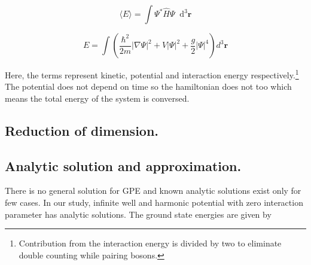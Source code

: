 \documentclass[a4paper,times,hidelinks,12pt]{article}
\newcommand*\dif{\mathop{}\!\mathrm{d}}
\begin{document}
\begin{equation}
\label{GPE_total_energy_general}
\langle E \rangle = \int \Psi^{*}\hat{H}\Psi \dif^3\boldsymbol{r}
\end{equation}

\begin{equation}
\label{GPE_total_energy}
E = \int \left(\frac {\hbar^2}{2m}|\nabla
\Psi|^2 + V|\Psi|^2 + \frac{g}{2}|\Psi|^4 \right) d^3\boldsymbol{r}
\end{equation}

Here, the terms represent kinetic, potential and interaction energy respectively.\footnote{Contribution from the interaction energy is divided by two to eliminate double counting while pairing bosons.} The potential does not depend on time so the hamiltonian does not too which means the total energy of the system is conversed. 

 
\subsection{Reduction of dimension.}
\subsection{Analytic solution and approximation.}

There is no general solution for GPE and known analytic solutions exist only for few cases. In our study, infinite well and harmonic potential with zero interaction parameter has analytic solutions. The ground state energies are given by
\end{document}
